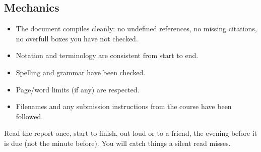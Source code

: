\subsection*{Mechanics}
\begin{itemize}[nosep]
      \item[$\square$] The document compiles cleanly: no undefined
            references, no missing citations, no overfull boxes you have not
            checked.
      \item[$\square$] Notation and terminology are consistent from start to
            end.
      \item[$\square$] Spelling and grammar have been checked.
      \item[$\square$] Page/word limits (if any) are respected.
      \item[$\square$] Filenames and any submission instructions from the
            course have been followed.
\end{itemize}

\begin{tipbox}
      Read the report once, start to finish, out loud or to a friend, the
      evening before it is due (not the minute before). You will catch things
      a silent read misses.
\end{tipbox}
